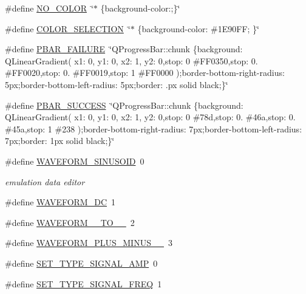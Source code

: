 \begin{DoxyCompactItemize}
\item 
\#define \hyperlink{a00090_a69d859e537f858ca285d77a66755ded6}{N\+O\+\_\+\+C\+O\+L\+O\+R}~\char`\"{}$\ast$ \{background-\/color\+:;\}\char`\"{}
\item 
\#define \hyperlink{a00090_ab32e4b2a4ecbb271c28640764ed4824c}{C\+O\+L\+O\+R\+\_\+\+S\+E\+L\+E\+C\+T\+I\+O\+N}~\char`\"{}$\ast$ \{background-\/color\+: \#1\+E90\+F\+F; \}\char`\"{}
\item 
\#define \hyperlink{a00090_aa9f43b2774395af6510910f8feed7cb4}{P\+B\+A\+R\+\_\+\+F\+A\+I\+L\+U\+R\+E}~\char`\"{}Q\+Progress\+Bar\+::chunk \{background\+: Q\+Linear\+Gradient( x1\+: 0, y1\+: 0, x2\+: 1, y2\+: 0,stop\+: 0 \#F\+F0350,stop\+: 0. \#F\+F0020,stop\+: 0. \#F\+F0019,stop\+: 1 \#F\+F0000 );border-\/bottom-\/right-\/radius\+: 5px;border-\/bottom-\/left-\/radius\+: 5px;border\+: .\+px solid black;\}\char`\"{}
\item 
\#define \hyperlink{a00090_a1ff3389746e26aa43aed6c6b7c9997bd}{P\+B\+A\+R\+\_\+\+S\+U\+C\+C\+E\+S\+S}~\char`\"{}Q\+Progress\+Bar\+::chunk \{background\+: Q\+Linear\+Gradient( x1\+: 0, y1\+: 0, x2\+: 1, y2\+: 0,stop\+: 0 \#78d,stop\+: 0. \#46a,stop\+: 0. \#45a,stop\+: 1 \#238 );border-\/bottom-\/right-\/radius\+: 7px;border-\/bottom-\/left-\/radius\+: 7px;border\+: 1px solid black;\}\char`\"{}
\item 
\#define \hyperlink{a00090_aab68961c5134b28289cb1311cac7d500}{W\+A\+V\+E\+F\+O\+R\+M\+\_\+\+S\+I\+N\+U\+S\+O\+I\+D}~0
\begin{DoxyCompactList}\small\item\em emulation data editor \end{DoxyCompactList}\item 
\#define \hyperlink{a00090_a0997727a7675c2520283e5c2b2018d7d}{W\+A\+V\+E\+F\+O\+R\+M\+\_\+\+D\+C}~1
\item 
\#define \hyperlink{a00090_ae18fed2471b16a8516d721ff60671dd9}{W\+A\+V\+E\+F\+O\+R\+M\+\_\+\_\+\+T\+O\+\_\+\_}~2
\item 
\#define \hyperlink{a00090_a0923d3b365a36e1e8c401cec964aa36f}{W\+A\+V\+E\+F\+O\+R\+M\+\_\+\+P\+L\+U\+S\+\_\+\+M\+I\+N\+U\+S\+\_\+\_}~3
\item 
\#define \hyperlink{a00090_a32500d8cf5fb09339cc8f97d52206b41}{S\+E\+T\+\_\+\+T\+Y\+P\+E\+\_\+\+S\+I\+G\+N\+A\+L\+\_\+\+A\+M\+P}~0
\item 
\#define \hyperlink{a00090_ac1c2065e42f20c51064c84c0db23e9f5}{S\+E\+T\+\_\+\+T\+Y\+P\+E\+\_\+\+S\+I\+G\+N\+A\+L\+\_\+\+F\+R\+E\+Q}~1
\item 

\end{DoxyCompactItemize}

